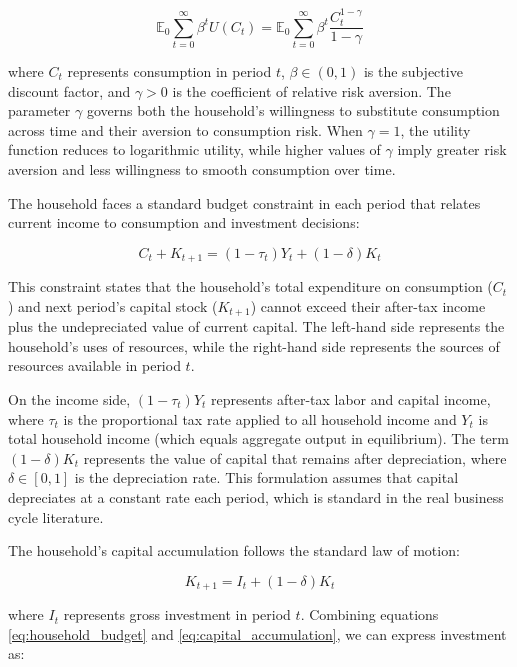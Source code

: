 \documentclass[5p,authoryear]{elsarticle}
\begin{document}
\begin{equation}
\mathbb{E}_0 \sum_{t=0}^{\infty} \beta^t U(C_t) = \mathbb{E}_0 \sum_{t=0}^{\infty} \beta^t \frac{C_t^{1-\gamma}}{1-\gamma}
\label{eq:household_utility}
\end{equation}

where $C_t$ represents consumption in period $t$, $\beta \in (0,1)$ is the subjective discount factor, and $\gamma > 0$ is the coefficient of relative risk aversion. The parameter $\gamma$ governs both the household's willingness to substitute consumption across time and their aversion to consumption risk. When $\gamma = 1$, the utility function reduces to logarithmic utility, while higher values of $\gamma$ imply greater risk aversion and less willingness to smooth consumption over time.

The household faces a standard budget constraint in each period that relates current income to consumption and investment decisions:

\begin{equation}
C_t + K_{t+1} = (1-\tau_t) Y_t + (1-\delta) K_t
\label{eq:household_budget}
\end{equation}

This constraint states that the household's total expenditure on consumption ($C_t$) and next period's capital stock ($K_{t+1}$) cannot exceed their after-tax income plus the undepreciated value of current capital. The left-hand side represents the household's uses of resources, while the right-hand side represents the sources of resources available in period $t$.

On the income side, $(1-\tau_t) Y_t$ represents after-tax labor and capital income, where $\tau_t$ is the proportional tax rate applied to all household income and $Y_t$ is total household income (which equals aggregate output in equilibrium). The term $(1-\delta) K_t$ represents the value of capital that remains after depreciation, where $\delta \in [0,1]$ is the depreciation rate. This formulation assumes that capital depreciates at a constant rate each period, which is standard in the real business cycle literature.

The household's capital accumulation follows the standard law of motion:

\begin{equation}
K_{t+1} = I_t + (1-\delta) K_t
\label{eq:capital_accumulation}
\end{equation}

where $I_t$ represents gross investment in period $t$. Combining equations \eqref{eq:household_budget} and \eqref{eq:capital_accumulation}, we can express investment as:
\end{document}
